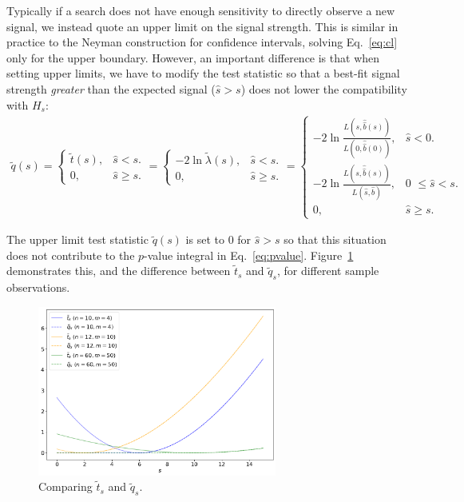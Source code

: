Typically if a search does not have enough sensitivity to directly observe a new signal, we instead quote an upper limit on the signal strength.
This is similar in practice to the Neyman construction for confidence intervals, solving Eq.~\ref{eq:cl} only for the upper boundary. However, an important difference is that when setting upper limits, we have to modify the test statistic so that a best-fit signal strength \textit{greater} than the expected signal ($\hat{s} > s$) does not lower the compatibility with $H_s$:
\begin{gather}
    \tilde{q}(s) = \left\{
        \begin{array}{ll}
          \tilde{t}(s), & \mbox{$\hat{s} < s$}.\\
          0, & \mbox{$\hat{s} \geq s$}.
        \end{array}
      \right.
      = \left\{
        \begin{array}{ll}
          -2\ln\tilde{\lambda}(s), & \mbox{$\hat{s} < s$}.\\
          0, & \mbox{$\hat{s} \geq s$}.
        \end{array}
      \right.
      = \left\{
      \begin{array}{ll}
          -2\ln\frac{L(s, \hat{\hat{b}}(s))}{L(0, \hat{\hat{b}}(0))}, & \mbox{$\hat{s}<0$}.\\
          -2\ln\frac{L(s, \hat{\hat{b}}(s))}{L(\hat{s}, \hat{b})}, & \mbox{0 $\leq \hat{s} < s$}.\\
          0, & \mbox{$\hat{s} \geq s$}.
        \end{array}
      \right.
  \label{eq:qs_tilde}
\end{gather}

The upper limit test statistic $\tilde{q}(s)$ is set to $0$ for $\hat{s} > s$ so that this situation does not contribute to the $p$-value integral in Eq.~\ref{eq:pvalue}.
Figure~\ref{fig:q_tilde_s} demonstrates this, and the difference between $\tilde{t}_s$ and $\tilde{q}_s$, for different sample observations.

\begin{figure}[htb]
\centering
\includegraphics[width=0.7\textwidth]{figures/03-intervals-and-limits/2.png}
\captionsetup{justification=centering}
\caption{Comparing $\tilde{t}_s$ and $\tilde{q}_s$.}
\label{fig:q_tilde_s}
\end{figure}

